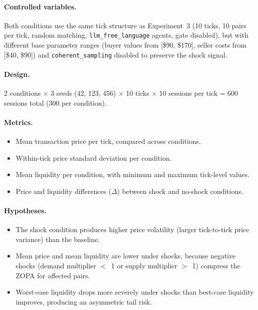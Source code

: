 \paragraph{Controlled variables.}
Both conditions use the same tick structure as Experiment~3 (10 ticks, 10 pairs per tick, random matching, \texttt{llm\_free\_language} agents, gate disabled), but with different base parameter ranges (buyer values from [\$90, \$170], seller costs from [\$40, \$90]) and \texttt{coherent\_sampling} disabled to preserve the shock signal.

\paragraph{Design.}
2 conditions $\times$ 3 seeds (42, 123, 456) $\times$ 10 ticks $\times$ 10 sessions per tick = 600 sessions total (300 per condition).

\paragraph{Metrics.}
\begin{itemize}
    \item Mean transaction price per tick, compared across conditions.
    \item Within-tick price standard deviation per condition.
    \item Mean liquidity per condition, with minimum and maximum tick-level values.
    \item Price and liquidity differences ($\Delta$) between shock and no-shock conditions.
\end{itemize}

\paragraph{Hypotheses.}
\begin{itemize}
    \item[\textbf{H-4a.}] The shock condition produces higher price volatility (larger tick-to-tick price variance) than the baseline.
    \item[\textbf{H-4b.}] Mean price and mean liquidity are lower under shocks, because negative shocks (demand multiplier $<$~1 or supply multiplier $>$~1) compress the ZOPA for affected pairs.
    \item[\textbf{H-4c.}] Worst-case liquidity drops more severely under shocks than best-case liquidity improves, producing an asymmetric tail risk.
\end{itemize}

